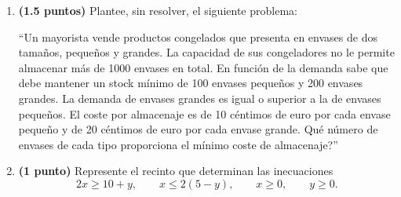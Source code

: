 
\begin{enumerate}[label=\alph*)]
\item \textbf{(1.5 puntos)} Plantee, sin resolver, el siguiente problema:

``Un mayorista vende productos congelados que presenta en envases de dos tamaños, pequeños y grandes. La capacidad de sus congeladores no le permite almacenar más de 1000 envases en total. En función de la demanda sabe que debe mantener un stock mínimo de 100 envases pequeños y 200 envases grandes. La demanda de envases grandes es igual o superior a la de envases pequeños. El coste por almacenaje es de 10 céntimos de euro por cada envase pequeño y de 20 céntimos de euro por cada envase grande. \textquestiondown{}Qué número de envases de cada tipo proporciona el mínimo coste de almacenaje?''
\item \textbf{(1 punto)} Represente el recinto que determinan las inecuaciones
\[
2x\geq10+y,\qquad x\leq2(5-y),\qquad x\geq0,\qquad y\geq0.
\]
\end{enumerate}
